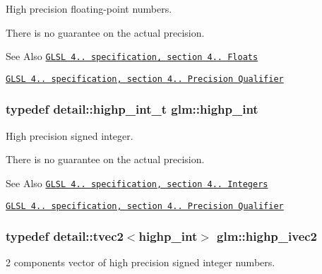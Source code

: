 High precision floating-\/point numbers. 

There is no guarantee on the actual precision.

\begin{DoxySeeAlso}{See Also}
\href{http://www.opengl.org/registry/doc/GLSLangSpec.4.20.8.pdf}{\tt G\-L\-S\-L 4.. specification, section 4.. Floats} 

\href{http://www.opengl.org/registry/doc/GLSLangSpec.4.20.8.pdf}{\tt G\-L\-S\-L 4.. specification, section 4.. Precision Qualifier} 
\end{DoxySeeAlso}
\hypertarget{group__core__precision_gaafed5240eb0a43328cb75faf5fb0a8c2}{
\subsubsection[{highp\-\_\-int}]{\setlength{\rightskip}{0pt plus 5cm}typedef detail\-::highp\-\_\-int\-\_\-t {\bf glm\-::highp\-\_\-int}}}\label{group__core__precision_gaafed5240eb0a43328cb75faf5fb0a8c2}


High precision signed integer. 

There is no guarantee on the actual precision.

\begin{DoxySeeAlso}{See Also}
\href{http://www.opengl.org/registry/doc/GLSLangSpec.4.20.8.pdf}{\tt G\-L\-S\-L 4.. specification, section 4.. Integers} 

\href{http://www.opengl.org/registry/doc/GLSLangSpec.4.20.8.pdf}{\tt G\-L\-S\-L 4.. specification, section 4.. Precision Qualifier} 
\end{DoxySeeAlso}
\hypertarget{group__core__precision_ga83738eb062e2e6b5e52cd0461da9c742}{
\subsubsection[{highp\-\_\-ivec2}]{\setlength{\rightskip}{0pt plus 5cm}typedef detail\-::tvec2$<$highp\-\_\-int$>$ {\bf glm\-::highp\-\_\-ivec2}}}\label{group__core__precision_ga83738eb062e2e6b5e52cd0461da9c742}


2 components vector of high precision signed integer numbers. 

